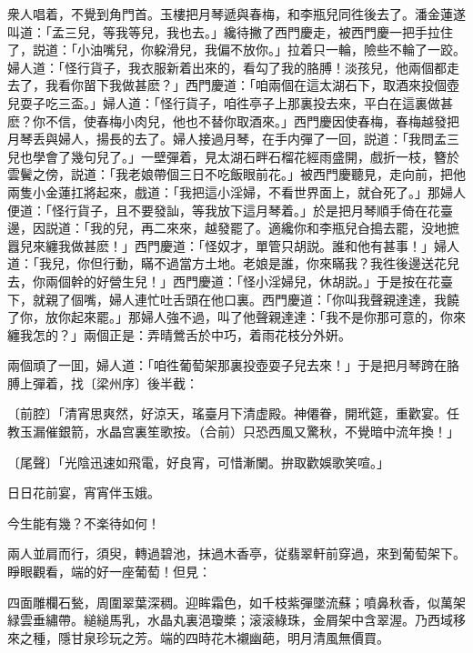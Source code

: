 衆人唱着，不覺到角門首。玉樓把月琴遞與春梅，和李瓶兒同徃後去了。潘金蓮遂叫道：「孟三兒，等我等兒，我也去。」纔待撇了西門慶走，被西門慶一把手拉住了，説道：「小油嘴兒，你躱滑兒，我偏不放你。」拉着只一輪，險些不輪了一跤。婦人道：「怪行貨子，我衣服新着出來的，看勾了我的胳膊！淡孩兒，他兩個都走去了，我看你㽞下我做甚麽？」西門慶道：「咱兩個在這太湖石下，取酒來投個壺兒耍子吃三盃。」婦人道：「怪行貨子，咱徃亭子上那裏投去來，平白在這裏做甚麽？你不信，使春梅小肉兒，他也不替你取酒來。」西門慶因使春梅，春梅越發把月琴丢與婦人，揚長的去了。婦人接過月琴，在手内彈了一回，説道：「我問孟三兒也學會了幾句兒了。」一壁彈着，見太湖石畔石榴花經雨盛開，戲折一枝，簪於雲鬢之傍，説道：「我老娘帶個三日不吃飯眼前花。」被西門慶聽見，走向前，把他兩隻小金蓮扛將起來，戲道：「我把這小淫婦，不看世界面上，就㒲死了。」那婦人便道：「怪行貨子，且不要發訕，等我放下這月琴着。」於是把月琴順手倚在花臺邊，因説道：「我的兒，再二來來，越發罷了。適纔你和李瓶兒㒲搗去罷，没地摭囂兒來纏我做甚麽！」西門慶道：「怪奴才，單管只胡説。誰和他有甚事！」婦人道：「我兒，你但行動，瞞不過當方土地。老娘是誰，你來瞞我？我徃後邊送花兒去，你兩個幹的好營生兒！」西門慶道：「怪小淫婦兒，休胡説。」于是按在花臺下，就親了個嘴，婦人連忙吐舌頭在他口裏。西門慶道：「你叫我聲親達達，我饒了你，放你起來罷。」那婦人強不過，叫了他聲親達達：「我不是你那可意的，你來纏我怎的？」兩個正是：弄晴鶯舌於中巧，着雨花枝分外姸。

兩個頑了一囬，婦人道：「咱徃葡萄架那裏投壺耍子兒去來！」于是把月琴跨在胳膊上彈着，找〔梁州序〕後半截：

\begin{myquote}
{\markfont〔前腔〕}「清宵思爽然，好涼天，瑤臺月下清虚殿。神僊眷，開玳筵，重歡宴。任教玉漏催銀箭，水晶宫裏笙歌按。{\marktext（合前）}只恐西風又驚秋，不覺暗中流年換！」

{\markfont〔尾聲〕}「光陰迅速如飛電，好良宵，可惜漸闌。拚取歡娛歌笑喧。」
\end{myquote}

\begin{myquote}
日日花前宴，宵宵伴玉娥。

今生能有幾？不楽待如何！　
\end{myquote}

兩人並肩而行，須臾，轉過碧池，抹過木香亭，従翡翠軒前穿過，來到葡萄架下。睜眼觀看，端的好一座葡萄！但見：

四面雕欄石甃，周圍翠葉深稠。迎眸霜色，如千枝紫彈墜流蘇；噴鼻秋香，似萬架緑雲垂繡帶。縋縋馬乳，水晶丸裏浥瓊槳；滚滚綠珠，金屑架中含翠渥。乃西域移來之種，隱甘泉珍玩之芳。端的四時花木襯幽葩，明月清風無價買。

